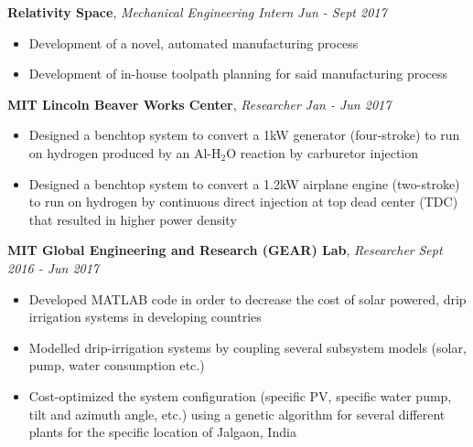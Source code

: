 \documentclass[9pt]{article}
\newenvironment{changemargin}[2]{%
  \begin{list}{}{%
    \setlength{\topsep}{0pt}%
    \setlength{\leftmargin}{#1}%
    \setlength{\rightmargin}{#2}%
    \setlength{\listparindent}{\parindent}%
    \setlength{\itemindent}{\parindent}%
    \setlength{\parsep}{\parskip}%
  }%
  \item[]}{\end{list}
}
\newcommand{\jobdescription}[1]{
	\begin{changemargin}{0.15in}{0.15in}
    \smallskip
		{#1}
    \medskip
	\end{changemargin}
}
\newcommand{\jobtitle}[3]{
	\textbf{#1}, \emph{#2} \hfill \emph{#3}\\
}
\newenvironment{body} {
	\vspace*{-16pt}
	\begin{changemargin}{-0.25in}{-0.5in}
  }	
	{\end{changemargin}
}
\begin{document}
\begin{body}
	\vspace{14pt}

  \jobtitle{Relativity Space}{Mechanical Engineering Intern}{Jun - Sept 2017}
  \jobdescription{
    \begin{itemize} \itemsep -0pt  %
      \item Development of a novel, automated manufacturing process
      \item Development of in-house toolpath planning for said manufacturing process
    \end{itemize}
  }

  \jobtitle{MIT Lincoln Beaver Works Center}{Researcher}{Jan - Jun 2017}
  \jobdescription{
    \begin{itemize} \itemsep -0pt  %
      \item Designed a benchtop system to convert a 1kW generator (four-stroke) to run on hydrogen produced by an Al-H$_2$O reaction by carburetor injection
      \item Designed a benchtop system to convert a 1.2kW airplane engine (two-stroke) to run on hydrogen by continuous direct injection at top dead center (TDC) that resulted in higher power density
    \end{itemize}
  }
  
  \jobtitle{MIT Global Engineering and Research (GEAR) Lab}{Researcher}{Sept 2016 - Jun 2017}
  \jobdescription{
    \begin{itemize} \itemsep -0pt  %
      \item Developed MATLAB code in order to decrease the cost of solar powered, drip irrigation systems in developing countries
      \item Modelled drip-irrigation systems by coupling several subsystem models (solar, pump, water consumption etc.)
      \item Cost-optimized the system configuration (specific PV, specific water pump, tilt and azimuth angle, etc.) using a genetic algorithm  for several different plants for the specific location of Jalgaon, India
    \end{itemize}
  }
  

\end{body}
\end{document}
